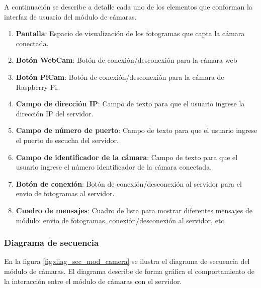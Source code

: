 A continuación se describe a detalle cada uno de los elementos que conforman la interfaz de usuario del módulo de cámaras.
\begin{enumerate}
    \item \textbf{Pantalla}: Espacio de  visualización de los fotogramas que capta la cámara conectada.
    \item \textbf{Botón WebCam}: Botón de conexión/desconexión para la cámara web
    \item \textbf{Botón PiCam}: Botón de conexión/desconexión para la cámara de Raspberry Pi.
    \item \textbf{Campo de dirección IP}: Campo de texto para que el usuario ingrese la dirección IP del servidor.
    \item \textbf{Campo de número de puerto}: Campo de texto para que el usuario ingrese el puerto de escucha del servidor.
    \item \textbf{Campo de identificador de la cámara}: Campo de texto para que el usuario ingrese el número identificador de la cámara conectada.
    \item \textbf{Botón de conexión}: Botón de conexión/desconexión al servidor para el envio de fotogramas al servidor.
    \item \textbf{Cuadro de mensajes}: Cuadro de lista para mostrar diferentes mensajes de módulo: envio de fotogramas, conexión/desconexión al servidor, etc.
\end{enumerate}

\subsubsection{Diagrama de secuencia}
En la figura \ref{fig:diag_sec_mod_camera} se ilustra el diagrama de secuencia del módulo de cámaras. El diagrama describe de forma gráfica el comportamiento de la interacción entre el módulo de cámaras con el servidor.

